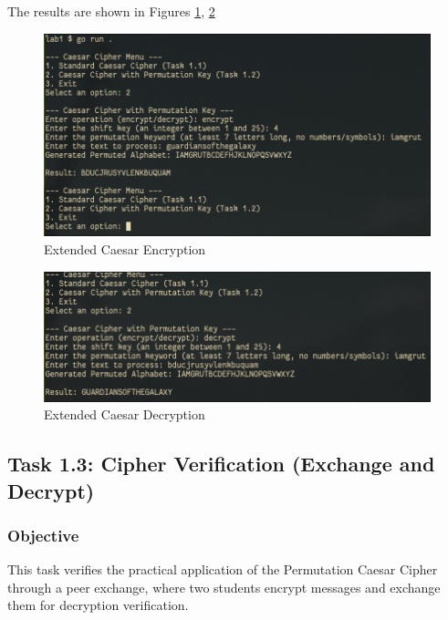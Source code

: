 \documentclass[a4paper,12pt]{article}
\begin{document}
The results are shown in Figures \ref{fig:orgcec9131}, \ref{fig:orgf34e517}
\begin{figure}[htbp]
\centering
\includegraphics[width=.9\linewidth]{./results/extended_caesar_enc.png}
\caption{\label{fig:orgcec9131}Extended Caesar Encryption}
\end{figure}

\begin{figure}[htbp]
\centering
\includegraphics[width=.9\linewidth]{./results/extended_caesar_dec.png}
\caption{\label{fig:orgf34e517}Extended Caesar Decryption}
\end{figure}
\subsection{Task 1.3: Cipher Verification (Exchange and Decrypt)}
\label{sec:org426ea34}
\subsubsection{Objective}
\label{sec:org5043ff3}
This task verifies the practical application of the Permutation Caesar Cipher through a peer exchange, where two students encrypt messages and exchange them for decryption verification.
\end{document}

